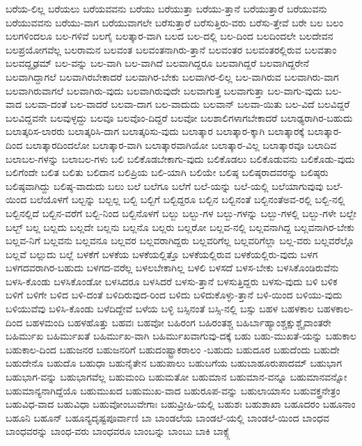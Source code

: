 {ಬರೆಯ-ಲಿಲ್ಲ
ಬರೆಯಲು
ಬರೆಯವವನು
ಬರೆಯು
ಬರೆಯುತ್ತಾ
ಬರೆಯು-ತ್ತಾನೆ
ಬರೆಯುತ್ತಾರೆ
ಬರೆಯುವನು
ಬರೆಯುವವನು
ಬರೆಯು-ವಾಗ
ಬರೆಯುವಾಗಲೇ
ಬರೆಸುತ್ತಾರೆ
ಬರೆಸುತ್ತಿರು-ವರು
ಬರೆಸು-ತ್ತೇವೆ
ಬರೇ
ಬಲ
ಬಲಂ
ಬಲಗಳಿಂದಲೂ
ಬಲ-ಗಳಿವೆ
ಬಲಗೈ
ಬಲತ್ಕಾರ-ವಾಗಿ
ಬಲದ
ಬಲ-ದಲ್ಲಿ
ಬಲ-ದಿಂದ
ಬಲದಿಂದಲೇ
ಬಲದೇವನ
ಬಲಪ್ರಯೋಗವೆಲ್ಲ
ಬಲರಾಮನ
ಬಲವಂತ
ಬಲವಂತನಾಗಿರು-ತ್ತಾನೆ
ಬಲವಂತರ
ಬಲವಂತರಲ್ಲಿರುವ
ಬಲವತಾಂ
ಬಲವದ್ದೃಢಮ್
ಬಲ-ವನ್ನು
ಬಲ-ವಾಗಿ
ಬಲ-ವಾಗಿದೆ
ಬಲವಾಗಿದ್ದರೂ
ಬಲವಾಗಿದ್ದರೆ
ಬಲವಾಗಿದ್ದರೇನೆ
ಬಲವಾಗಿದ್ದಾಗಲೆ
ಬಲವಾಗಿರಬೇಕಾದರೆ
ಬಲವಾಗಿರ-ಬೇಕು
ಬಲವಾಗಿರ-ಲಿಲ್ಲ
ಬಲ-ವಾಗಿರುವ
ಬಲವಾಗಿರು-ವಾಗ
ಬಲವಾಗಿರುವಾಗಲೆ
ಬಲವಾಗಿರು-ವುದು
ಬಲವಾಗಿರುವುದೇ
ಬಲವಾಗುತ್ತ
ಬಲವಾಗುತ್ತಾ
ಬಲ-ವಾಗು-ವುದು
ಬಲ-ವಾದ
ಬಲವಾ-ದಂತೆ
ಬಲ-ವಾದರೆ
ಬಲವಾ-ದಾಗ
ಬಲ-ವಾದುದು
ಬಲವಾನ್
ಬಲವಾ-ಯಿತು
ಬಲ-ವಿದೆ
ಬಲವಿದ್ದರೆ
ಬಲವಿದ್ದವನೇ
ಬಲವುಳ್ಳದ್ದು
ಬಲವೂ
ಬಲವೊಂ-ದಿದ್ದರೆ
ಬಲವೋ
ಬಲಶಾಲಿಗಳಾಗಬೇಕಾದರೆ
ಬಲಾಢ್ಯರಾಗಿರ-ಬಹುದು
ಬಲಾತ್ಕರಿಸ-ಲಾರರು
ಬಲಾತ್ಕರಿಸಿ-ದಾಗ
ಬಲಾತ್ಕರಿಸು-ವುದು
ಬಲಾತ್ಕಾರ
ಬಲಾತ್ಕಾರ-ಕ್ಕಾಗಿ
ಬಲಾತ್ಕಾರಕ್ಕೆ
ಬಲಾತ್ಕಾರ-ದಿಂದ
ಬಲಾತ್ಕಾರದಿಂದಲೋ
ಬಲಾತ್ಕಾರ-ವಾಗಿ
ಬಲಾತ್ಕಾರವಾಗಿಯೋ
ಬಲಾತ್ಕಾರ-ವಿಲ್ಲ
ಬಲಾತ್ಕಾರವೂ
ಬಲಾದಿವ
ಬಲಾಬಲ-ಗಳನ್ನು
ಬಲಾಬಲ-ಗಳು
ಬಲಿ
ಬಲಿಕೊಡಬೇಕಾಗು-ವುದು
ಬಲಿಕೊಡಲು
ಬಲಿಕೊಡುವನು
ಬಲಿಕೊಡು-ವುದು
ಬಲಿಗೆಂದೇ
ಬಲಿತ
ಬಲಿತು
ಬಲಿದಾನ
ಬಲಿಪ್ರಿಯ
ಬಲಿ-ಯಾಗಿ
ಬಲಿಯೇ
ಬಲಿಷ್ಠ
ಬಲಿಷ್ಠರಾದವರನ್ನು
ಬಲಿಷ್ಠರು
ಬಲಿಷ್ಠವಾಗಿದ್ದು
ಬಲಿಷ್ಠ-ವಾದುದು
ಬಲು
ಬಲೆ
ಬಲೆಗೂ
ಬಲೆಗೆ
ಬಲೆ-ಯನ್ನು
ಬಲೆ-ಯಲ್ಲಿ
ಬಲೆಯಾಗುವುವು
ಬಲೆ-ಯಿಂದ
ಬಲೆಯೊಳಗೆ
ಬಲ್ಬನ್ನು
ಬಲ್ಬಲ್ಲ
ಬಲ್ಬಿ
ಬಲ್ಬಿಗೆ
ಬಲ್ಬಿದ್ದರೂ
ಬಲ್ಬಿನ
ಬಲ್ಬಿನಂತೆ
ಬಲ್ಬಿನಂತೆಅವ-ರಲ್ಲಿ
ಬಲ್ಬಿ-ನಲ್ಲಿ
ಬಲ್ಬಿನಲ್ಲಿದೆ
ಬಲ್ಬಿನ-ವರೆಗೆ
ಬಲ್ಬಿ-ನಿಂದ
ಬಲ್ಬಿನೊಳಗೆ
ಬಲ್ಬು
ಬಲ್ಬು-ಗಳ
ಬಲ್ಬು-ಗಳನ್ನು
ಬಲ್ಬು-ಗಳಲ್ಲಿ
ಬಲ್ಬು-ಗಳೇ
ಬಲ್ಬೇ
ಬಲ್ಬ್
ಬಲ್ಲ
ಬಲ್ಲದು
ಬಲ್ಲದೇ
ಬಲ್ಲನು
ಬಲ್ಲನೊ
ಬಲ್ಲರು
ಬಲ್ಲರೋ
ಬಲ್ಲವ-ನಲ್ಲಿ
ಬಲ್ಲವನಾಗಿದ್ದ
ಬಲ್ಲವನಾಗಿರ-ಬೇಕು
ಬಲ್ಲವ-ನಿಗೆ
ಬಲ್ಲವನು
ಬಲ್ಲವನೂ
ಬಲ್ಲವರ
ಬಲ್ಲವರಾಗಿದ್ದರು
ಬಲ್ಲವರಿಗೆಲ್ಲ
ಬಲ್ಲವರಿಗೆಲ್ಲಾ
ಬಲ್ಲ-ವರು
ಬಲ್ಲವರೆಲ್ಲೊ
ಬಲ್ಲವೆ
ಬಲ್ಲುದು
ಬಲ್ಲೆ
ಬಳಕೆಗೆ
ಬಳಕೆಯ
ಬಳಕೆಯಲ್ಲಿತ್ತೊ
ಬಳಕೆಯಲ್ಲಿರುವ
ಬಳಕೆಯಲ್ಲಿರು-ವುದು
ಬಳಗ
ಬಳಗದವರಾಗಿರ-ಬಹುದು
ಬಳಗದ-ವರೆಲ್ಲ
ಬಳಲಬೇಕಾಗಿಲ್ಲ
ಬಳಲಿ
ಬಳಸದೆ
ಬಳಸ-ಬೇಕು
ಬಳಸಿಕೊಂಡಿರುವೆನು
ಬಳಸಿ-ಕೊಂಡು
ಬಳಸಿಕೊಂಡೋ
ಬಳಸಿದರೂ
ಬಳಸಿದರೆ
ಬಳಸು-ತ್ತಾನೆ
ಬಳಸುತ್ತಿದ್ದರು
ಬಳಸು-ವುದು
ಬಳಿ
ಬಳಿಕ
ಬಳಿಗೆ
ಬಳಿಗೇ
ಬಳಿದ
ಬಳಿ-ದಂತೆ
ಬಳಿದಿರುವುದ-ರಿಂದ
ಬಳಿದು
ಬಳಿದುಕೊಳ್ಳು-ತ್ತಾನೆ
ಬಳಿ-ಯಿಂದ
ಬಳಿಯು-ವುದು
ಬಳಿಯುವೆವು
ಬಳಿಸಿ-ಕೊಂಡು
ಬಳೆದಿದ್ದೇವೆ
ಬಳೆಯ
ಬಳ್ಳಿ
ಬಸ್ಸಿನಂತೆ
ಬಸ್ಸಿ-ನಲ್ಲಿ
ಬಸ್ಸು
ಬಹಳ
ಬಹಳಕಾಲ
ಬಹಳಕಾಲ-ದಿಂದ
ಬಹಳಮಂದಿ
ಬಹಳಹೊತ್ತು
ಬಹವಃ
ಬಹವೋ
ಬಹಿರಂಗ
ಬಹಿರಂತಶ್ಚ
ಬಹಿರ್ಬಾಹ್ಯಾಂಶ್ಚಕ್ಷುಶ್ಚೈವಾಂತರೇ
ಬಹಿರ್ಮುಖ
ಬಹಿರ್ಮುಖತೆ
ಬಹಿರ್ಮುಖ-ವಾಗಿ
ಬಹಿರ್ಮುಖವಾಗುವು-ದಕ್ಕೆ
ಬಹು
ಬಹು-ಮುಖತೆ-ಯನ್ನು
ಬಹುಕಾಲ
ಬಹುಕಾಲ-ದಿಂದ
ಬಹುಜನರ
ಬಹುಜನರಿಗೆ
ಬಹುದಂಷ್ಟ್ರಾಕರಾಲಂ
-ಬಹುದು
ಬಹುದೂರ
ಬಹುದೆಂದು
ಬಹುದೇ
ಬಹುದೇನೊ
ಬಹುದೊ
ಬಹುಧಾ
ಬಹುನೈತೇನ
ಬಹುಪಾಲು
ಬಹುಬಗೆಯ
ಬಹುಬಾಹೂರುಪಾದಮ್
ಬಹುಭಾಗ
ಬಹುಭಾಗ-ವನ್ನು
ಬಹುಭಾಗವೆಲ್ಲ
ಬಹುಮಂದಿ
ಬಹುಮತೋ
ಬಹುಮಾನ
ಬಹುಮಾನ-ವನ್ನೂ
ಬಹುಮಾನವನ್ನೋ
ಬಹುಮಾನ್ಯನಾಗಿದ್ದೆಯೊ
ಬಹುಮುಖದ
ಬಹುಮುಖ-ವಾದ
ಬಹುರೂಪ-ವನ್ನು
ಬಹುಲಾಯಾಸಂ
ಬಹುವಕ್ತ್ರನೇತ್ರಂ
ಬಹುವಿಧ-ವಾದ
ಬಹುವಿಧಾ
ಬಹುವೋಂಬುವೇಗಾಃ
ಬಹುವ್ರೀಹಿ-ಯಲ್ಲಿ
ಬಹುಶಃ
ಬಹುಶಾಖಾ
ಬಹೂದರಂ
ಬಹೂನಾಂ
ಬಹೂನಿ
ಬಹೂನ್
ಬಹೂನ್ಯದೃಷ್ಟಪೂರ್ವಾಣಿ
ಬಾ
ಬಾಂಡಲೆಯ
ಬಾಂಡಲೆ-ಯಲ್ಲಿ
ಬಾಂಡಲೆ-ಯಿಂದ
ಬಾಂಧವ
ಬಾಂಧವರನ್ನು
ಬಾಂಧ-ವರು
ಬಾಂಧವರೂ
ಬಾಂಬನ್ನು
ಬಾಂಬು
ಬಾಕಿ
ಬಾಕ್ಸ್ಗೆ
}
